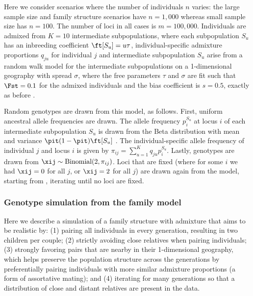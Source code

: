 \documentclass[12pt]{article}
\begin{document}
Here we consider scenarios where the number of individuals $n$ varies:
the large sample size and family structure scenarios have $n = 1,000$ whereas small sample size has $n = 100$.
The number of loci in all cases is $m = 100,000$.
Individuals are admixed from $K = 10$ intermediate subpopulations, where each subpopulation $S_u$ has an inbreeding coefficient $\ft[S_u] = u \tau$, individual-specific admixture proportions $q_{ju}$ for individual $j$ and intermediate subpopulation $S_u$ arise from a random walk model for the intermediate subpopulations on a 1-dimensional geography with spread $\sigma$, where the free parameters $\tau$ and $\sigma$ are fit such that $\Fst = 0.1$ for the admixed individuals and the bias coefficient is $s = 0.5$, exactly as before \citep{ochoa_fst2}.

Random genotypes are drawn from this model, as follows.
First, uniform ancestral allele frequencies \pit are drawn.
The allele frequency $p_i^{S_u}$ at locus $i$ of each intermediate subpopulation $S_u$ is drawn from the Beta distribution with mean \pit and variance $\pit(1-\pit) \ft[S_u]$ \citep{balding_method_1995}.
The individual-specific allele frequency of individual $j$ and locus $i$ is given by
$
\pi_{ij} = \sum_{u = 1}^K q_{ju} p_i^{S_u}.
$
Lastly, genotypes are drawn from $\xij \sim \text{Binomial}(2, \pi_{ij})$.
Loci that are fixed (where for some $i$ we had $\xij = 0$ for all $j$, or $\xij = 2$ for all $j$) are drawn again from the model, starting from \pit, iterating until no loci are fixed.

\subsubsection{Genotype simulation from the family model}

Here we describe a simulation of a family structure with admixture that aims to be realistic by:
(1) pairing all individuals in every generation, resulting in two children per couple;
(2) strictly avoiding close relatives when pairing individuals;
(3) strongly favoring pairs that are nearby in their 1-dimensional geography, which helps preserve the population structure across the generations by preferentially pairing individuals with more similar admixture proportions (a form of assortative mating); and
(4) iterating for many generations so that a distribution of close and distant relatives are present in the data.
\end{document}
